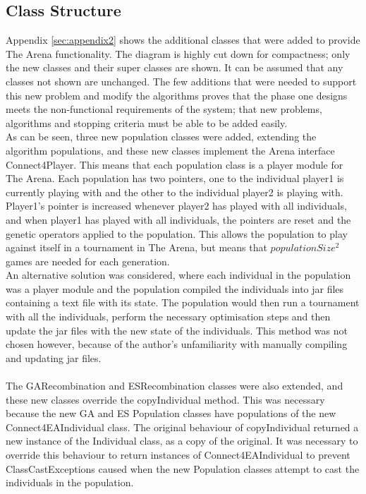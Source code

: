 \subsection{Class Structure}
Appendix \ref{sec:appendix2} shows the additional classes that were added to provide The Arena functionality. The diagram is highly cut down for compactness; only the new classes and their super classes are shown. It can be assumed that any classes not shown are unchanged. The few additions that were needed to support this new problem and modify the algorithms proves that the phase one designs meets the non-functional requirements of the system; that new problems, algorithms and stopping criteria must be able to be added easily.
\\As can be seen, three new population classes were added, extending the algorithm populations, and these new classes implement the Arena interface Connect4Player. This means that each population class is a player module for The Arena. Each population has two pointers, one to the individual player1 is currently playing with and the other to the individual player2 is playing with. Player1's pointer is increased whenever player2 has played with all individuals, and when player1 has played with all individuals, the pointers are reset and the genetic operators applied to the population. This allows the population to play against itself in a tournament in The Arena, but means that $populationSize^{2}$ games are needed for each generation. 
\\An alternative solution was considered, where each individual in the population was a player module and the population compiled the individuals into jar files containing a text file with its state. The population would then run a tournament with all the individuals, perform the necessary optimisation steps and then update the jar files with the new state of the individuals. This method was not chosen however, because of the author's unfamiliarity with manually compiling and updating jar files. 
\\\\The GARecombination and ESRecombination classes were also extended, and these new classes override the copyIndividual method. This was necessary because the new GA and ES Population classes have populations of the new Connect4EAIndividual class. The original behaviour of copyIndividual returned a new instance of the Individual class, as a copy of the original. It was necessary to override this behaviour to return instances of Connect4EAIndividual to prevent ClassCastExceptions caused when the new Population classes attempt to cast the individuals in the population.
